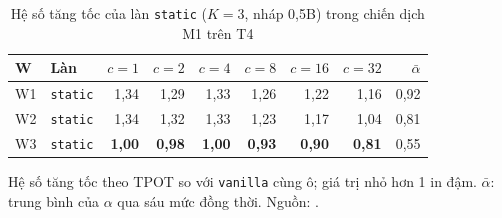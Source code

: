 \begin{table}[htbp]
\centering
\caption{Hệ số tăng tốc của làn \texttt{static} ($K=3$, nháp 0,5B) trong chiến dịch M1 trên T4}
\label{tab:m1}
\small
\begin{tabular}{@{}llrrrrrrr@{}}
\toprule
\textbf{W} & \textbf{Làn} & $c=1$ & $c=2$ & $c=4$ & $c=8$ & $c=16$ & $c=32$ & $\bar\alpha$ \\
\midrule
W1 & \texttt{static} & 1{,}34 & 1{,}29 & 1{,}33 & 1{,}26 & 1{,}22 & 1{,}16 & 0{,}92 \\
\midrule
W2 & \texttt{static} & 1{,}34 & 1{,}32 & 1{,}33 & 1{,}23 & 1{,}17 & 1{,}04 & 0{,}81 \\
\midrule
W3 & \texttt{static} & \textbf{1{,}00} & \textbf{0{,}98} & \textbf{1{,}00} & \textbf{0{,}93} & \textbf{0{,}90} & \textbf{0{,}81} & 0{,}55 \\
\bottomrule
\end{tabular}

\vspace{2pt}
{\footnotesize Hệ số tăng tốc theo TPOT so với \texttt{vanilla} cùng ô; giá trị nhỏ hơn 1 in đậm. $\bar\alpha$: trung bình của $\alpha$ qua sáu mức đồng thời. Nguồn: .}
\end{table}
